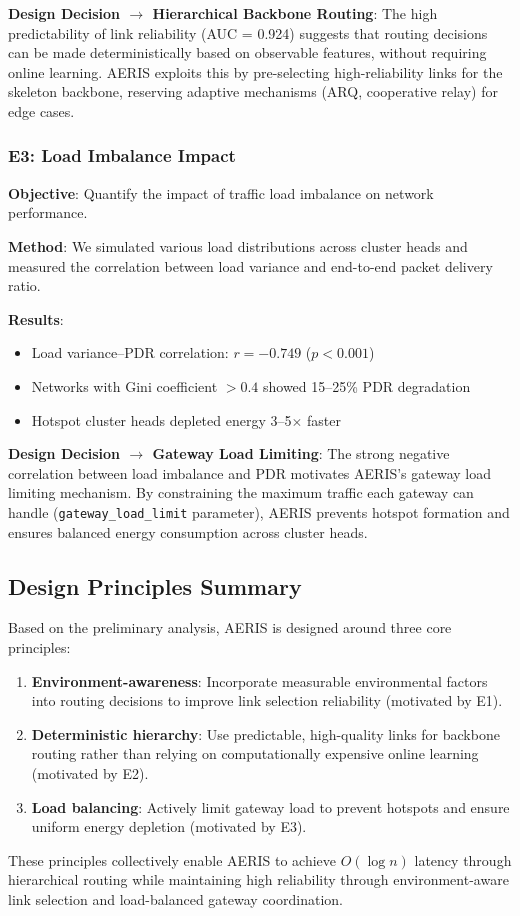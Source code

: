 \textbf{Design Decision $\rightarrow$ Hierarchical Backbone Routing}:
The high predictability of link reliability (AUC = 0.924) suggests that
routing decisions can be made deterministically based on observable
features, without requiring online learning. AERIS exploits this by
pre-selecting high-reliability links for the skeleton backbone, reserving
adaptive mechanisms (ARQ, cooperative relay) for edge cases.

\subsubsection{E3: Load Imbalance Impact}

\textbf{Objective}: Quantify the impact of traffic load imbalance on
network performance.

\textbf{Method}: We simulated various load distributions across cluster
heads and measured the correlation between load variance and end-to-end
packet delivery ratio.

\textbf{Results}:
\begin{itemize}
    \item Load variance--PDR correlation: $r = -0.749$ ($p < 0.001$)
    \item Networks with Gini coefficient $> 0.4$ showed 15--25\% PDR
    degradation
    \item Hotspot cluster heads depleted energy 3--5$\times$ faster
\end{itemize}

\textbf{Design Decision $\rightarrow$ Gateway Load Limiting}:
The strong negative correlation between load imbalance and PDR motivates
AERIS's gateway load limiting mechanism. By constraining the maximum
traffic each gateway can handle (\texttt{gateway\_load\_limit} parameter),
AERIS prevents hotspot formation and ensures balanced energy consumption
across cluster heads.

\subsection{Design Principles Summary}

Based on the preliminary analysis, AERIS is designed around three
core principles:

\begin{enumerate}
    \item \textbf{Environment-awareness}: Incorporate measurable
    environmental factors into routing decisions to improve link
    selection reliability (motivated by E1).

    \item \textbf{Deterministic hierarchy}: Use predictable, high-quality
    links for backbone routing rather than relying on computationally
    expensive online learning (motivated by E2).

    \item \textbf{Load balancing}: Actively limit gateway load to prevent
    hotspots and ensure uniform energy depletion (motivated by E3).
\end{enumerate}

These principles collectively enable AERIS to achieve $O(\log n)$ latency
through hierarchical routing while maintaining high reliability through
environment-aware link selection and load-balanced gateway coordination.
